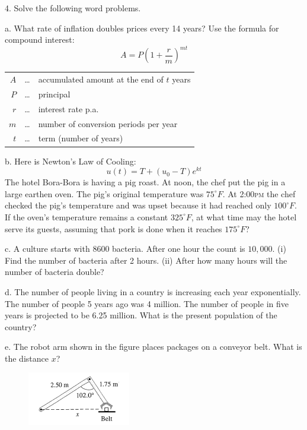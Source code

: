 \documentclass[11pt]{article}
\begin{document}
4. Solve the following word problems.

a. What rate of inflation doubles prices every 14 years? Use the
formula for compound interest:
\begin{equation}
  \label{eq:quahphia}
    A=P\left(1+\frac{r}{m}\right)^{mt}
\end{equation}
\begin{tabular}{rcl}
  $A$&\ldots&accumulated amount at the end of $t$ years \\
  $P$&\ldots&principal \\
  $r$&\ldots&interest rate p.a. \\
  $m$&\ldots&number of conversion periods per year \\
  $t$&\ldots&term (number of years)
\end{tabular}

b. Here is Newton's Law of Cooling:
\begin{equation}
  \label{eq:iemahbec}
  u(t)=T+(u_{0}-T)e^{kt}
\end{equation}
The hotel Bora-Bora is having a pig roast. At noon, the chef put the
pig in a large earthen oven. The pig's original temperature was
$75^{\circ}F$. At 2:00\textsc{pm} the chef checked the pig's
temperature and was upset because it had reached only $100^{\circ}F$.
If the oven's temperature remains a constant $325^{\circ}F$, at what
time may the hotel serve its guests, assuming that pork is done when
it reaches $175^{\circ}F$?


c. A culture starts with 8600 bacteria. After one hour the count is
$10,000$. (i) Find the number of bacteria after 2 hours. (ii) After
how many hours will the number of bacteria double?

d. The number of people living in a country is increasing each year
exponentially. The number of people 5 years ago was 4 million. The
number of people in five years is projected to be 6.25 million. What
is the present population of the country?

\newpage

e. The robot arm shown in the figure places packages on a conveyor
belt. What is the distance $x$?

\begin{figure}[h]
   \includegraphics[scale=.5]{./tri-01.png}
\end{figure}
\end{document}
